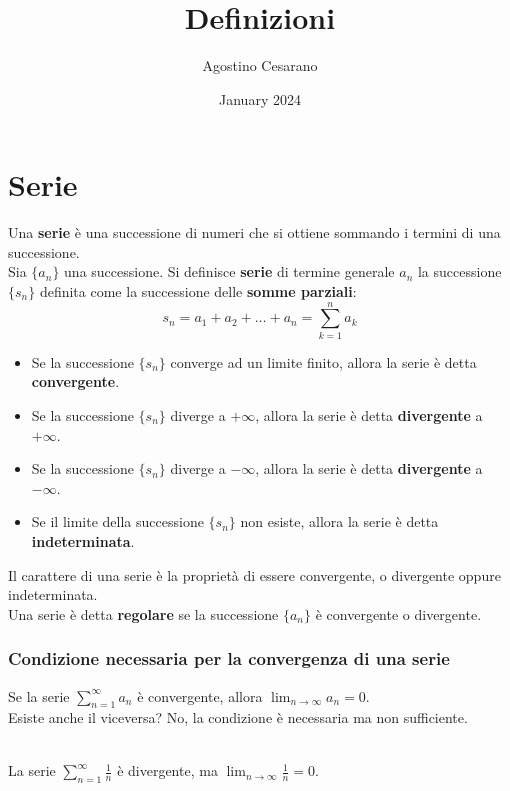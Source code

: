 \documentclass{article}
\title{Definizioni}
\author{Agostino Cesarano}
\date{January 2024}
\begin{document}
\maketitle
\setcounter{part}{5}
\part{Serie}
Una \textbf{serie} è una successione di numeri che si ottiene sommando i
termini di una successione.\\ Sia $\{a_n\}$ una successione. Si definisce
\textbf{serie} di termine generale ${a_n}$ la successione $\{s_n\}$ definita
come la successione delle \textbf{somme parziali}:
\begin{equation*}
    s_n = a_1 + a_2 + \dots + a_n = \sum_{k=1}^n a_k
\end{equation*}
\begin{itemize}
    \item Se la successione $\{s_n\}$ converge ad un limite finito, allora la serie è
          detta \textbf{convergente}.
    \item Se la successione $\{s_n\}$ diverge a $+\infty$, allora la serie è detta
          \textbf{divergente} a $+\infty$.
    \item Se la successione $\{s_n\}$ diverge a $-\infty$, allora la serie è detta
          \textbf{divergente} a $-\infty$.
    \item Se il limite della successione $\{s_n\}$ non esiste, allora la serie è detta
          \textbf{indeterminata}.
\end{itemize}
Il carattere di una serie è la proprietà di essere convergente, o divergente oppure indeterminata.\\
Una serie è detta \textbf{regolare} se la successione $\{a_n\}$ è convergente o divergente.
\section*{Condizione necessaria per la convergenza di una serie}
Se la serie $\sum_{n=1}^\infty a_n$ è convergente, allora $\lim_{n \to \infty} a_n = 0$.\\
Esiste anche il viceversa? No, la condizione è necessaria ma non sufficiente.\\\\
\begin{esbox}
    La serie $\sum_{n=1}^\infty \frac{1}{n}$ è divergente, ma $\lim_{n \to \infty} \frac{1}{n} = 0$.
\end{esbox}
\end{document}
